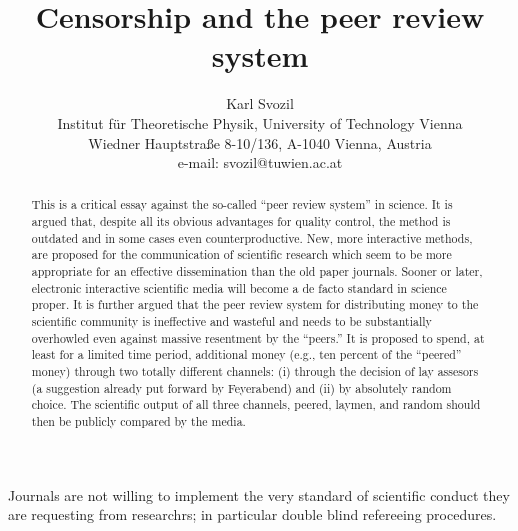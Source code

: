 

\sloppy



\title{Censorship and the peer review system}
\author{Karl Svozil\\
 {\small Institut f\"ur Theoretische Physik, University of Technology Vienna }     \\
  {\small Wiedner Hauptstra\ss e 8-10/136,}
  {\small A-1040 Vienna, Austria   }            \\
  {\small e-mail: svozil@tuwien.ac.at}}
\date{ }
\maketitle


\begin{abstract}
This is a critical essay against the so-called ``peer review system'' in science.
It is argued that, despite all its obvious advantages for quality control,
the method is outdated and in some cases even counterproductive.
New, more interactive methods, are proposed for the communication of scientific research
which seem to be more appropriate for an effective dissemination  than the old paper journals.
Sooner or later, electronic interactive scientific media
will become a de facto standard in science proper.
It is further argued that the peer review system for distributing money to the scientific
community
is ineffective and wasteful and needs to be substantially overhowled
even against massive resentment by the ``peers.''
It is proposed to spend, at least for a limited time period,
additional money (e.g., ten percent of the ``peered'' money)
through two totally different channels:
(i) through the decision of lay assesors (a suggestion already put forward by Feyerabend)
and
(ii) by absolutely random choice. The scientific output of all three channels, peered, laymen, and random
should then be publicly compared by the media.
\end{abstract}


Journals are not willing to implement the very standard of scientific conduct they are requesting from researchrs; in particular double blind refereeing procedures.


